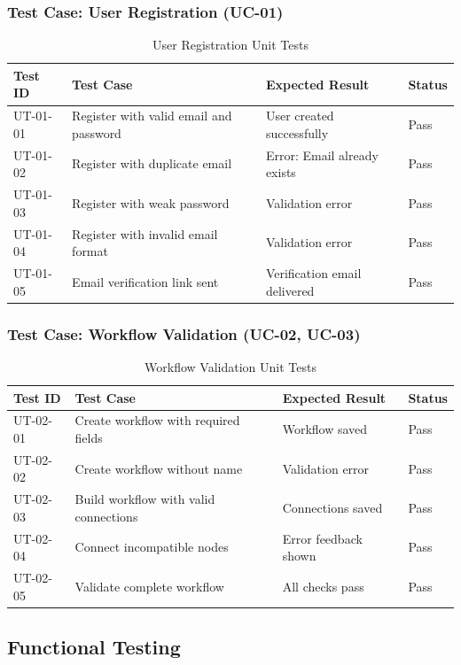 \documentclass[12pt,a4paper]{article}
\begin{document}
\subsubsection{Test Case: User Registration (UC-01)}
\begin{table}[h]
\centering
\begin{tabularx}{\textwidth}{|l|X|l|l|}
\hline
\textbf{Test ID} & \textbf{Test Case} & \textbf{Expected Result} & \textbf{Status}\\
\hline
UT-01-01 & Register with valid email and password & User created successfully & Pass\\
\hline
UT-01-02 & Register with duplicate email & Error: Email already exists & Pass\\
\hline
UT-01-03 & Register with weak password & Validation error & Pass\\
\hline
UT-01-04 & Register with invalid email format & Validation error & Pass\\
\hline
UT-01-05 & Email verification link sent & Verification email delivered & Pass\\
\hline
\end{tabularx}
\caption{User Registration Unit Tests}
\end{table}

\subsubsection{Test Case: Workflow Validation (UC-02, UC-03)}
\begin{table}[h]
\centering
\begin{tabularx}{\textwidth}{|l|X|l|l|}
\hline
\textbf{Test ID} & \textbf{Test Case} & \textbf{Expected Result} & \textbf{Status}\\
\hline
UT-02-01 & Create workflow with required fields & Workflow saved & Pass\\
\hline
UT-02-02 & Create workflow without name & Validation error & Pass\\
\hline
UT-02-03 & Build workflow with valid connections & Connections saved & Pass\\
\hline
UT-02-04 & Connect incompatible nodes & Error feedback shown & Pass\\
\hline
UT-02-05 & Validate complete workflow & All checks pass & Pass\\
\hline
\end{tabularx}
\caption{Workflow Validation Unit Tests}
\end{table}

\subsection{Functional Testing}
\end{document}
